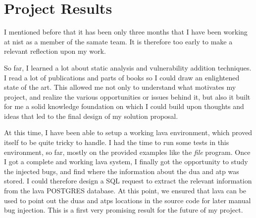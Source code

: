 \section{Project Results}

I mentioned before that it has been only three months that I have been working at \gls{nist} as a member of the \gls{samate} team. It is therefore too early to make a relevant reflection upon my work.

So far, I learned a lot about static analysis and vulnerability addition techniques. I read a lot of publications and parts of books so I could draw an enlightened state of the art. This allowed me not only to understand what motivates my project, and realize the various opportunities or issues behind it, but also it built for me a solid knowledge foundation on which I could build upon thoughts and ideas that led to the final design of my solution proposal.

At this time, I have been able to setup a working \gls{lava} environment, which proved itself to be quite tricky to handle. I had the time to run some tests in this environment, so far, mostly on the provided examples like the \emph{file} program. Once I got a complete and working \gls{lava} system, I finally got the opportunity to study the injected bugs, and find where the information about the \acrfull{dua} and \acrfull{atp} was stored. I could therefore design a SQL request to extract the relevant information from the \gls{lava} POSTGRES database. At this point, we ensured that \gls{lava} can be used to point out the \glspl{dua} and \glspl{atp} locations in the source code for later manual bug injection. This is a first very promising result for the future of my project.